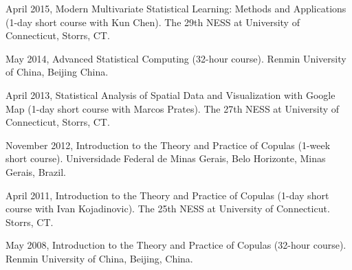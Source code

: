 \documentclass[Statistics]{vita}
\begin{document}
\begin{vita}
\begin{InvitedTalksLectures}
\begin{InvitedWorkshops}
  \item April 2015, Modern Multivariate Statistical Learning: Methods and Applications (1-day short course with Kun Chen). The 29th NESS at University of Connecticut, Storrs, CT.
  \item May 2014, Advanced Statistical Computing (32-hour course). Renmin University of China, Beijing China.
  \item April 2013, Statistical Analysis of Spatial Data and Visualization with Google Map (1-day short course with Marcos Prates). The 27th NESS at University of Connecticut, Storrs, CT.
  \item November 2012, Introduction to the Theory and Practice of Copulas (1-week short course). Universidade Federal de Minas Gerais, Belo Horizonte, Minas Gerais, Brazil.
  \item April 2011, Introduction to the Theory and Practice of Copulas (1-day short course with Ivan Kojadinovic). The 25th NESS at University of Connecticut. Storrs, CT.
  \item May 2008, Introduction to the Theory and Practice of Copulas (32-hour course). Renmin University of China, Beijing, China.
  \end{InvitedWorkshops}
\end{InvitedTalksLectures}
\end{vita}
\end{document}
